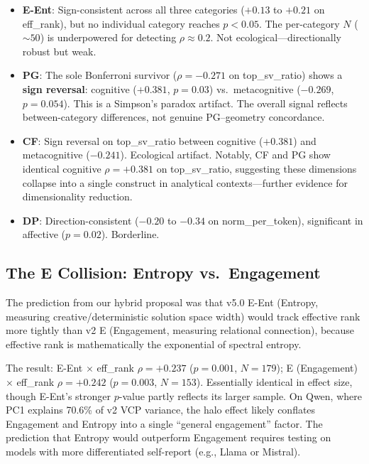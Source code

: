 \documentclass[11pt,a4paper]{article}
\begin{document}
\begin{itemize}
    \item \textbf{E-Ent}: Sign-consistent across all three categories ($+0.13$ to $+0.21$ on eff\_rank), but no individual category reaches $p < 0.05$. The per-category $N$ (${\sim}50$) is underpowered for detecting $\rho \approx 0.2$. Not ecological---directionally robust but weak.

    \item \textbf{PG}: The sole Bonferroni survivor ($\rho = -0.271$ on top\_sv\_ratio) shows a \textbf{sign reversal}: cognitive ($+0.381$, $p = 0.03$) vs.\ metacognitive ($-0.269$, $p = 0.054$). This is a Simpson's paradox artifact. The overall signal reflects between-category differences, not genuine PG--geometry concordance.

    \item \textbf{CF}: Sign reversal on top\_sv\_ratio between cognitive ($+0.381$) and metacognitive ($-0.241$). Ecological artifact. Notably, CF and PG show identical cognitive $\rho = +0.381$ on top\_sv\_ratio, suggesting these dimensions collapse into a single construct in analytical contexts---further evidence for dimensionality reduction.

    \item \textbf{DP}: Direction-consistent ($-0.20$ to $-0.34$ on norm\_per\_token), significant in affective ($p = 0.02$). Borderline.
\end{itemize}

\subsection{The E Collision: Entropy vs.\ Engagement}

The prediction from our hybrid proposal was that v5.0 E-Ent (Entropy, measuring creative/deterministic solution space width) would track effective rank more tightly than v2 E (Engagement, measuring relational connection), because effective rank is mathematically the exponential of spectral entropy.

The result: E-Ent $\times$ eff\_rank $\rho = +0.237$ ($p = 0.001$, $N = 179$); E (Engagement) $\times$ eff\_rank $\rho = +0.242$ ($p = 0.003$, $N = 153$). Essentially identical in effect size, though E-Ent's stronger $p$-value partly reflects its larger sample. On Qwen, where PC1 explains 70.6\% of v2 VCP variance, the halo effect likely conflates Engagement and Entropy into a single ``general engagement'' factor. The prediction that Entropy would outperform Engagement requires testing on models with more differentiated self-report (e.g., Llama or Mistral).
\end{document}
